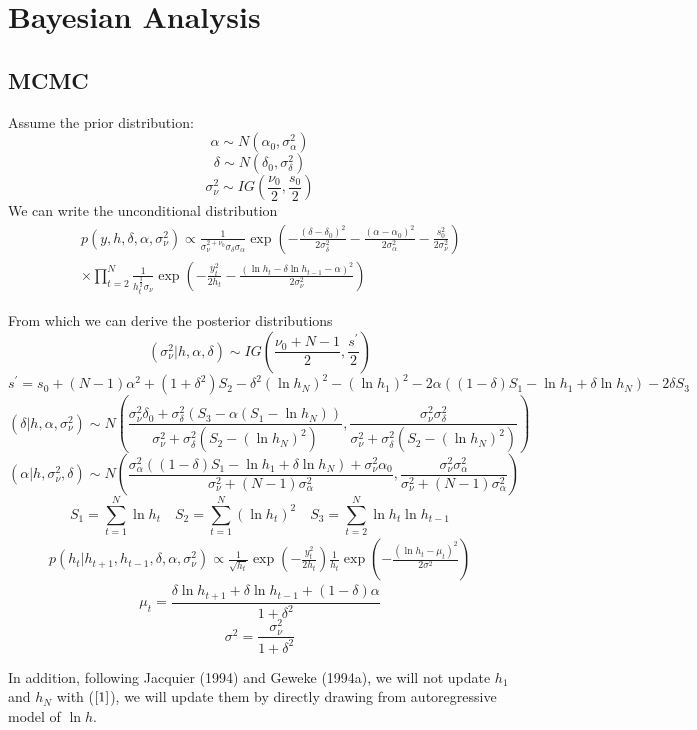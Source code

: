 \documentclass{article}
\begin{document}
\section{Bayesian Analysis}
\subsection{MCMC}
Assume the prior distribution:
\[
\alpha\sim N(\alpha_0,\sigma_\alpha^2)
\]
\[
\delta\sim N(\delta_0,\sigma_\delta^2)
\]
\[
\sigma_\nu^2\sim IG(\frac{\nu_0}{2},\frac{s_0}{2})
\]
We can write the unconditional distribution
\begin{eqnarray}
&&p(y,h,\delta,\alpha,\sigma_\nu^2)\propto\frac{1}{\sigma_\nu^{2+\nu_0}\sigma_\delta\sigma_\alpha}\exp\left(-\frac{(\delta-\delta_0)^2}{2\sigma_\delta^2}-\frac{(\alpha-\alpha_0)^2}{2\sigma_\alpha^2}-\frac{s_0^2}{2\sigma_\nu^2}\right)\nonumber\\
&&\times\prod_{t=2}^{N}\frac{1}{h_t^{\frac{3}{2}}\sigma_\nu}\exp\left(-\frac{y_t^2}{2h_t}-\frac{(\ln h_t-\delta\ln h_{t-1}-\alpha)^2}{2\sigma^2_\nu}\right)
\end{eqnarray}

From which we can derive the posterior distributions
\[
(\sigma_\nu^2|h,\alpha,\delta)\sim IG\left(\frac{\nu_0+N-1}{2},\frac{s^\prime}{2}\right)
\]
\[
s^\prime=s_0+(N-1)\alpha^2+(1+\delta^2)S_2-\delta^2(\ln h_N)^2-(\ln h_1)^2-2\alpha((1-\delta)S_1-\ln h_1+\delta\ln h_N)-2\delta S_3
\]
\[
(\delta|h,\alpha,\sigma_\nu^2)\sim N\left(\frac{\sigma_\nu^2\delta_0+\sigma_\delta^2(S_3-\alpha(S_1-\ln h_N))}{\sigma_\nu^2+\sigma_\delta^2(S_2-(\ln h_N)^2)},\frac{\sigma_\nu^2\sigma_\delta^2}{\sigma_\nu^2+\sigma_\delta^2(S_2-(\ln h_N)^2)}\right)
\]
\[
(\alpha|h,\sigma_\nu^2,\delta)\sim N\left(\frac{\sigma_\alpha^2((1-\delta)S_1-\ln h_1+\delta\ln h_N)+\sigma_\nu^2\alpha_0}{\sigma_\nu^2+(N-1)\sigma_\alpha^2},\frac{\sigma_\nu^2\sigma_\alpha^2}{\sigma_\nu^2+(N-1)\sigma_\alpha^2}\right)
\]
\[
S_1=\sum_{t=1}^N\ln h_t\quad S_2=\sum_{t=1}^N(\ln h_t)^2\quad S_3=\sum_{t=2}^N \ln h_t\ln h_{t-1}
\]
\begin{eqnarray}\label{1}
p(h_t|h_{t+1},h_{t-1},\delta,\alpha,\sigma_\nu^2)\propto\frac{1}{\sqrt{h_t}}\exp\left(-\frac{y_t^2}{2h_t}\right)\frac{1}{h_t}\exp\left(-\frac{(\ln h_t-\mu_t)^2}{2\sigma^2}\right)
\end{eqnarray}
\[
\mu_t=\frac{\delta\ln h_{t+1}+\delta\ln h_{t-1}+(1-\delta)\alpha}{1+\delta^2}
\]
\[
\sigma^2=\frac{\sigma_\nu^2}{1+\delta^2}
\]

In addition, following Jacquier (1994) and Geweke (1994a), we will not update $h_1$ and $h_N$ with ($\ref{1}$), we will update them by directly drawing from autoregressive model of $\ln h$.
\end{document}
